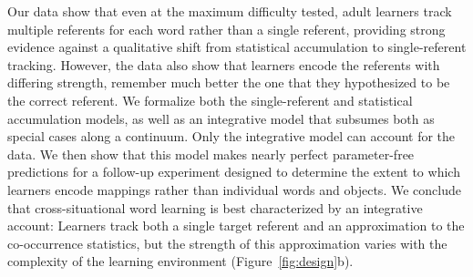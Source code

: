 \documentclass[man,floatsintext]{apa6}
\begin{document}
Our data show that even at the maximum difficulty tested, adult learners track multiple referents for each word rather than a single referent, providing strong evidence against a qualitative shift from statistical accumulation to single-referent tracking. However, the data also show that learners encode the referents with differing strength, remember much better the one that they hypothesized to be the correct referent. We formalize both the single-referent and statistical accumulation models, as well as an integrative model that subsumes both as special cases along a continuum. Only the integrative model can account for the data. We then show that this model makes nearly perfect parameter-free predictions for a follow-up experiment designed to determine the extent to which learners encode mappings rather than individual words and objects. We conclude that cross-situational word learning is best characterized by an integrative account: Learners track both a single target referent and an approximation to the co-occurrence statistics, but the strength of this approximation varies with the complexity of the learning environment (Figure~\ref{fig:design}b). 
\end{document}
